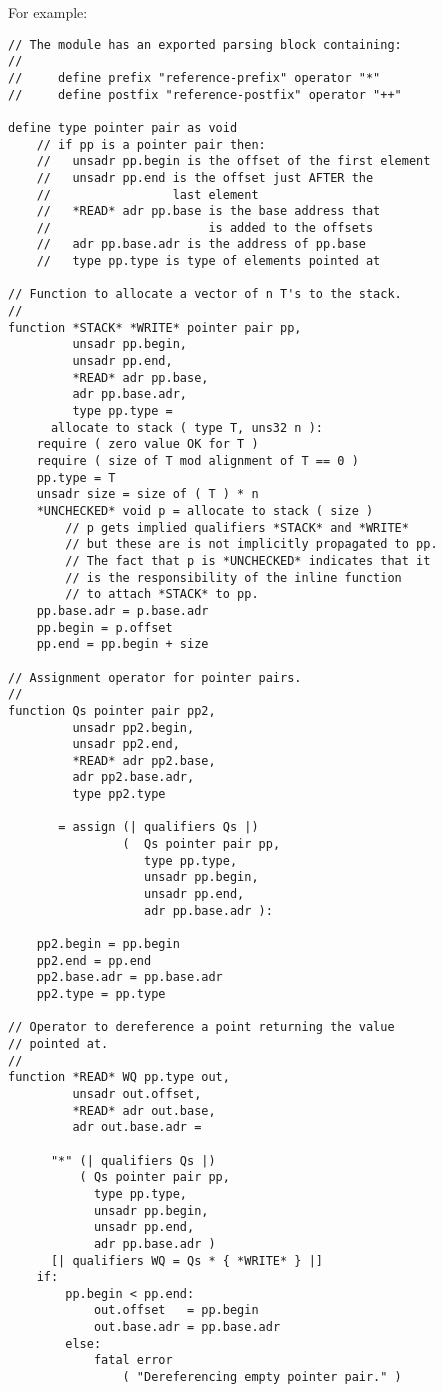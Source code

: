 \documentclass[12pt]{article}
\newenvironment{indpar}[1][0.3in]%
	{\begin{list}{}%
		     {\setlength{\itemsep}{0in}%
		      \setlength{\topsep}{0in}%
		      \setlength{\parsep}{1ex}%
		      \setlength{\labelwidth}{#1}%
		      \setlength{\leftmargin}{#1}%
		      \addtolength{\leftmargin}{\labelsep}}%
	 \item}%
	{\end{list}}
\begin{document}
For example:
\begin{indpar}\begin{verbatim}
// The module has an exported parsing block containing:
//
//     define prefix "reference-prefix" operator "*"
//     define postfix "reference-postfix" operator "++"

define type pointer pair as void
    // if pp is a pointer pair then:
    //   unsadr pp.begin is the offset of the first element
    //   unsadr pp.end is the offset just AFTER the
    //                 last element
    //   *READ* adr pp.base is the base address that
    //                      is added to the offsets
    //   adr pp.base.adr is the address of pp.base
    //   type pp.type is type of elements pointed at

// Function to allocate a vector of n T's to the stack.
//
function *STACK* *WRITE* pointer pair pp,
         unsadr pp.begin,
         unsadr pp.end,
         *READ* adr pp.base,
         adr pp.base.adr,
         type pp.type =
      allocate to stack ( type T, uns32 n ):
    require ( zero value OK for T )
    require ( size of T mod alignment of T == 0 )
    pp.type = T
    unsadr size = size of ( T ) * n
    *UNCHECKED* void p = allocate to stack ( size )
        // p gets implied qualifiers *STACK* and *WRITE*
        // but these are is not implicitly propagated to pp.
        // The fact that p is *UNCHECKED* indicates that it
        // is the responsibility of the inline function
        // to attach *STACK* to pp.
    pp.base.adr = p.base.adr
    pp.begin = p.offset
    pp.end = pp.begin + size

// Assignment operator for pointer pairs.
//
function Qs pointer pair pp2,
         unsadr pp2.begin,
         unsadr pp2.end,
         *READ* adr pp2.base,
         adr pp2.base.adr,
         type pp2.type

       = assign (| qualifiers Qs |)
                (  Qs pointer pair pp,
                   type pp.type,
                   unsadr pp.begin,
                   unsadr pp.end,
                   adr pp.base.adr ):

    pp2.begin = pp.begin
    pp2.end = pp.end
    pp2.base.adr = pp.base.adr
    pp2.type = pp.type

// Operator to dereference a point returning the value
// pointed at.
//
function *READ* WQ pp.type out,
         unsadr out.offset,
         *READ* adr out.base,
         adr out.base.adr =

      "*" (| qualifiers Qs |)
          ( Qs pointer pair pp,
            type pp.type,
            unsadr pp.begin,
            unsadr pp.end,
            adr pp.base.adr )
      [| qualifiers WQ = Qs * { *WRITE* } |]
    if:
        pp.begin < pp.end:
            out.offset   = pp.begin
            out.base.adr = pp.base.adr
        else:
            fatal error
                ( "Dereferencing empty pointer pair." )


\end{verbatim}
\end{indpar}
\end{document}
